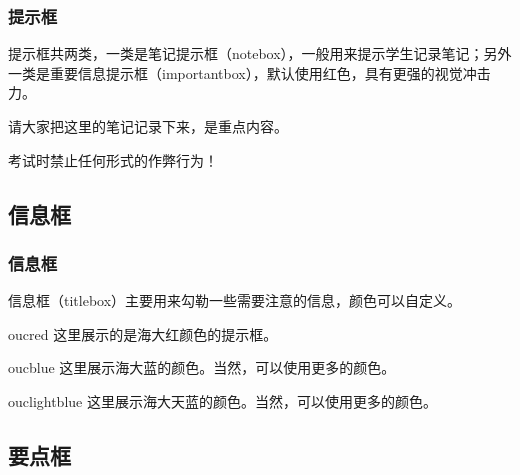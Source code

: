 \documentclass[aspectratio=169,UTF8,t]{beamer}%
\begin{document}
\begin{frame}
    \frametitle{提示框}
    提示框共两类，一类是笔记提示框（notebox），一般用来提示学生记录笔记；另外一类是重要信息提示框（importantbox），默认使用红色，具有更强的视觉冲击力。
      \begin{notebox}[笔记]
        请大家把这里的笔记记录下来，是重点内容。 
      \end{notebox}
      \begin{importantbox}[重要]
        考试时禁止任何形式的作弊行为！
      \end{importantbox}              
\end{frame}

\subsection{信息框}

\begin{frame}
    \frametitle{信息框}
    信息框（titlebox）主要用来勾勒一些需要注意的信息，颜色可以自定义。
    \begin{titlebox}[提示框]{oucred}
        这里展示的是海大红颜色的提示框。
      \end{titlebox}
      \begin{titlebox}[颜色展示]{oucblue}
        这里展示海大蓝的颜色。当然，可以使用更多的颜色。 
      \end{titlebox}
      \begin{titlebox}[另外一些颜色的显示]{ouclightblue}
        这里展示海大天蓝的颜色。当然，可以使用更多的颜色。 
      \end{titlebox}    
\end{frame}

\subsection{要点框}
\end{document}
